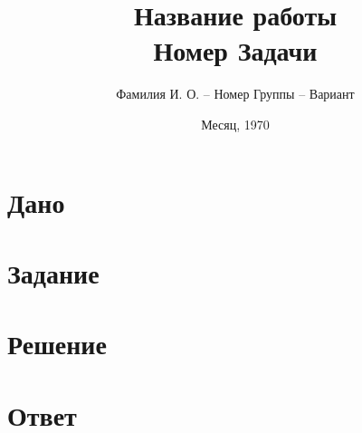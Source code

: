 \documentclass{article}
\title{Название работы\\Номер Задачи}
\author{Фамилия И. О. -- Номер Группы -- Вариант}
\date{Месяц, 1970}
\begin{document}
\maketitle


\section*{Дано}


\section*{Задание}


\section*{Решение}


\section*{Ответ}
\end{document}

